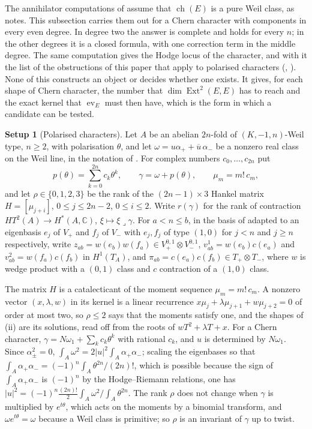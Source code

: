 \documentclass[11pt,reqno]{amsart}
\theoremstyle{plain}
\theoremstyle{definition}
\newtheorem{setupenv}[theorem]{Setup}
\theoremstyle{remark}
\newcommand{\CC}{\mathbb{C}}
\DeclareMathOperator{\ch}{ch}
\DeclareMathOperator{\Ext}{Ext}
\newcommand{\bbar}[1]{\overline{#1}}
\begin{document}
The annihilator computations of \cite[Section~16]{paperI} assume that $\ch(E)$
is a pure Weil class, as  notes. This subsection carries
them out for a Chern character with components in every even degree. In
degree two the answer is complete and holds for every $n$; in the other
degrees it is a closed formula, with one correction term in the middle
degree. The same computation gives the Hodge locus of the character,
and with it the list of the obstructions of this paper that apply to
polarised characters (, ).
None of this constructs an object or decides whether one exists. It gives,
for each shape of Chern character, the number that $\dim\Ext^{2}(E,E)$ has
to reach and the exact kernel that $\operatorname{ev}_{E}$ must then have,
which is the form in which a candidate can be tested.

\begin{setupenv}[Polarised characters]\label{setup:p2prime}
Let $A$ be an abelian $2n$-fold of $(K,-1,n)$-Weil type, $n\ge2$, with
polarisation $\theta$, and let $\omega=u\alpha_{+}+\bbar u\,\alpha_{-}$ be a
nonzero real class on the Weil line, in the notation of .
For complex numbers $c_{0},\dots,c_{2n}$ put
\[
  p(\theta)=\sum_{k=0}^{2n}c_{k}\theta^{k},\qquad
  \gamma=\omega+p(\theta),\qquad \mu_{m}=m!\,c_{m},
\]
and let $\rho\in\{0,1,2,3\}$ be the rank of the $(2n-1)\times3$ Hankel matrix
$H=[\mu_{j+i}]$, $0\le j\le2n-2$, $0\le i\le2$. Write $r(\gamma)$ for the
rank of contraction $HT^{2}(A)\to H^{*}(A,\CC)$, $\xi\mapsto\xi\lrcorner\gamma$.
For $a<n\le b$, in the basis of  adapted to an
eigenbasis $e_{j}$ of $V_{+}$ and $f_{j}$ of $V_{-}$ with $e_{j},f_{j}$ of
type $(1,0)$ for $j<n$ and $j\ge n$ respectively, write
$z_{ab}=w(e_{b})w(f_{a})\in V_{+}^{0,1}\otimes V_{-}^{0,1}$,
$v^{1}_{ab}=w(e_{b})c(e_{a})$ and $v^{2}_{ab}=w(f_{a})c(f_{b})$ in
$H^{1}(T_{A})$, and $\pi_{ab}=c(e_{a})c(f_{b})\in T_{+}\otimes T_{-}$, where
$w$ is wedge product with a $(0,1)$ class and $c$ contraction of a $(1,0)$
class.
\end{setupenv}

The matrix $H$ is a catalecticant of the moment sequence
$\mu_{m}=m!\,c_{m}$. A nonzero vector $(x,\lambda,w)$ in its kernel is a
linear recurrence $x\mu_{j}+\lambda\mu_{j+1}+w\mu_{j+2}=0$ of order at most
two, so $\rho\le2$ says that the moments satisfy one, and the shapes of
(ii) are its solutions, read off from the roots of
$wT^{2}+\lambda T+x$. For a Chern character,
$\gamma=N\omega_{1}+\sum_{k}c_{k}\theta^{k}$ with rational $c_{k}$, and $u$
is determined by $N\omega_{1}$. Since $\alpha_{\pm}^{2}=0$,
$\int_{A}\omega^{2}=2|u|^{2}\int_{A}\alpha_{+}\alpha_{-}$; scaling the
eigenbases so that $\int_{A}\alpha_{+}\alpha_{-}=(-1)^{n}\int_{A}\theta^{2n}/(2n)!$,
which is possible because the sign of $\int_{A}\alpha_{+}\alpha_{-}$ is
$(-1)^{n}$ by the Hodge--Riemann relations, one has
$|u|^{2}=(-1)^{n}\tfrac{(2n)!}{2}\int_{A}\omega^{2}\big/\!\int_{A}\theta^{2n}$.
The rank
$\rho$ does not change when
$\gamma$ is multiplied by $e^{t\theta}$, which acts on the moments by a
binomial transform, and $\omega e^{t\theta}=\omega$ because a Weil class is
primitive; so $\rho$ is an invariant of $\gamma$ up to twist.
\end{document}
